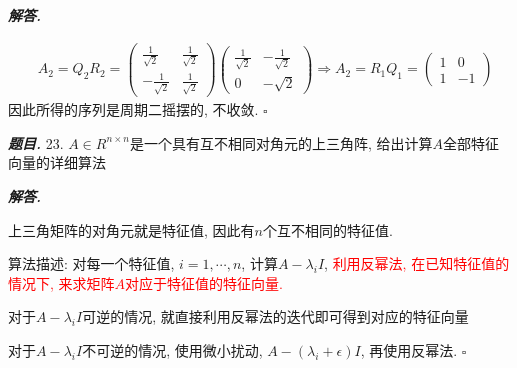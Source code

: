 \documentclass[10pt, a4paper, oneside]{ctexart}
\newenvironment{problem}{\begin{framed}\par\noindent\textbf{\textit{题目. }}}{\end{framed}\par}
\newenvironment{solution}{%
  \par\noindent\textbf{\textit{解答. }}\ignorespaces
}{%
  \hfill\ensuremath{\square}\par %
}
\begin{document}
\begin{solution}
\begin{align*}
    &A_2=Q_2R_2=\begin{pmatrix}
        \frac{1}{\sqrt{2}}&\frac{1}{\sqrt{2}}\\
        -\frac{1}{\sqrt{2}}&\frac{1}{\sqrt{2}}
    \end{pmatrix}\begin{pmatrix}
        \frac{1}{\sqrt{2}}&-\frac{1}{\sqrt{2}}\\
        0&-\sqrt{2}
    \end{pmatrix}\Rightarrow A_2=R_1Q_1=\begin{pmatrix}
        1&0\\1&-1
    \end{pmatrix} 
\end{align*}
因此所得的序列是周期二摇摆的, 不收敛.
\end{solution}

\begin{problem}
    23. $A\in R^{n\times n}$是一个具有互不相同对角元的上三角阵, 给出计算$A$全部特征向量的详细算法 
\end{problem}
\begin{solution}
    上三角矩阵的对角元就是特征值, 因此有$n$个互不相同的特征值.

    算法描述: 对每一个特征值, $i=1,\cdots,n$, 计算$A-\lambda_i I$, \textcolor{red}{利用反幂法, 在已知特征值的情况下, 来求矩阵$A$对应于特征值的特征向量.}

    对于$A-\lambda_i I$可逆的情况, 就直接利用反幂法的迭代即可得到对应的特征向量

    对于$A-\lambda_i I$不可逆的情况, 使用微小扰动, $A-(\lambda_i+\epsilon) I$, 再使用反幂法.
\end{solution}
\end{document}
